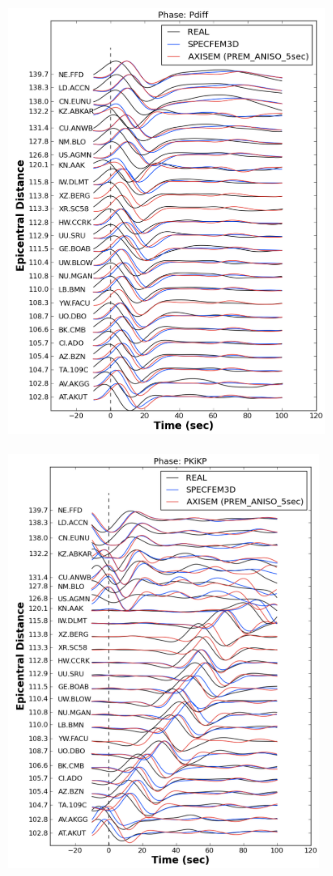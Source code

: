 \documentclass{article}
\begin{document}
\includegraphics[width=238pt, height=321pt, keepaspectratio=true]{AXISEMTutorial-fig010.pdf}

\includegraphics[width=233pt, height=311pt, keepaspectratio=true]{AXISEMTutorial-fig011.pdf}
\end{document}
